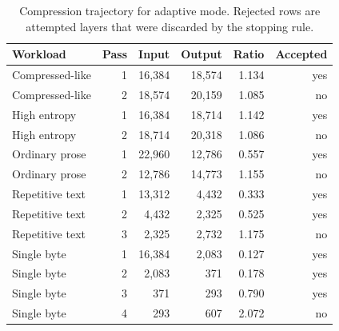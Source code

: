 \begin{table}[t]
\caption{Compression trajectory for adaptive mode. Rejected rows are attempted layers that were discarded by the stopping rule.}
\label{tab:passes}
\centering
\small
\begin{tabular}{lrrrrr}
\toprule
Workload & Pass & Input & Output & Ratio & Accepted \\
\midrule
Compressed-like & 1 & 16,384 & 18,574 & 1.134 & yes \\
Compressed-like & 2 & 18,574 & 20,159 & 1.085 & no \\
High entropy & 1 & 16,384 & 18,714 & 1.142 & yes \\
High entropy & 2 & 18,714 & 20,318 & 1.086 & no \\
Ordinary prose & 1 & 22,960 & 12,786 & 0.557 & yes \\
Ordinary prose & 2 & 12,786 & 14,773 & 1.155 & no \\
Repetitive text & 1 & 13,312 & 4,432 & 0.333 & yes \\
Repetitive text & 2 & 4,432 & 2,325 & 0.525 & yes \\
Repetitive text & 3 & 2,325 & 2,732 & 1.175 & no \\
Single byte & 1 & 16,384 & 2,083 & 0.127 & yes \\
Single byte & 2 & 2,083 & 371 & 0.178 & yes \\
Single byte & 3 & 371 & 293 & 0.790 & yes \\
Single byte & 4 & 293 & 607 & 2.072 & no \\
\bottomrule
\end{tabular}
\end{table}
